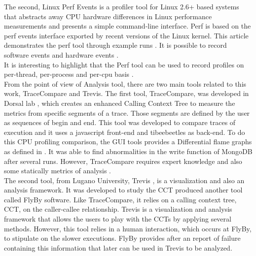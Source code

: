 The second, Linux Perf Events is a profiler tool for Linux 2.6+ based systems that abstracts away CPU hardware differences in Linux performance measurements and presents a simple command-line interface. Perf is based on the perf events interface exported by recent versions of the Linux kernel. This article demonstrates the perf tool through example runs \cite{perf}. It is possible to record software events and hardware events \cite{vitillo}.\\
It is interesting to highlight that the Perf tool can be used to record profiles on per-thread, per-process and per-cpu basis \cite{perftool}.\\
From the point of view of Analysis tool, there are two main tools related to this work, TraceCompare and Trevis.
The first tool, TraceCompare, was developed in Dorsal lab \cite{tracecompare}, which creates an enhanced Calling Context Tree to measure the metrics from specific segments of a trace. Those segments are defined by the user as sequences of begin and end. This tool was developed to compare traces of execution and it uses a javascript front-end and tibeebeetles as back-end. To do this CPU profiling comparison, the GUI tools provides a Differential flame graphs as defined in \cite{differential_flame}.
 It was able to find abnormalities in the write function of MongoDB after several runs. However, TraceCompare requires expert knowledge and also some statically metrics of analysis \cite{doray_thesis}.\\
The second tool, from Lugano University, Trevis \cite{trevis}, is a visualization and also an analysis framework. It was developed to study the CCT produced another tool called FlyBy software. Like TraceCompare, it relies on a calling context tree, CCT, on the caller-callee relationship. Trevis is a visualization and analysis framework that 
allows the users to play with the CCTs by applying several methods.
However, this tool relies in a human interaction, which occurs at FlyBy, to stipulate on the slower executions. FlyBy provides after an report of failure containing this information that later can be used in Trevis to be analyzed.\\
